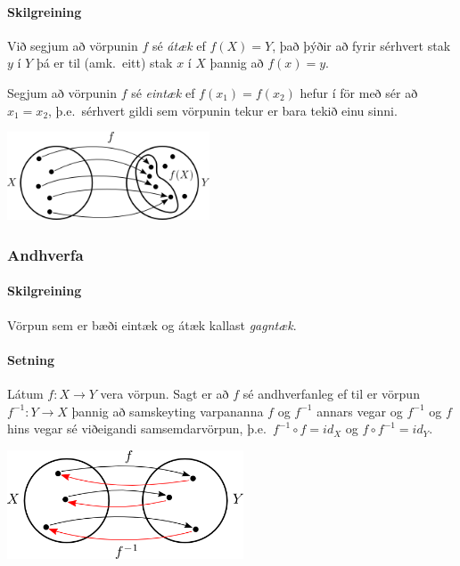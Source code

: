 \documentclass[icelandic,a4paper,12pt]{article}
\begin{document}
\pause

\paragraph{Skilgreining}
Við segjum að vörpunin $f$ sé \emph{átæk} ef $f(X)=Y$, það þýðir að 
fyrir sérhvert stak $y$ í $Y$ þá er til (amk.~eitt) stak
$x$ í $X$ þannig að $f(x)=y$.

\pause

Segjum að vörpunin $f$ sé \emph{eintæk} ef $f(x_1) = f(x_2)$ 
hefur í för með sér að $x_1=x_2$, þ.e.~sérhvert gildi sem
vörpunin tekur er bara tekið einu sinni.


\begin{center}
 \includegraphics[width=6cm,keepaspectratio=true]{./myndir/kafli01/02_Mynd_vorpunar.png}
\end{center}



\subsubsection*{Andhverfa}
 \paragraph{Skilgreining}
  Vörpun sem er bæði eintæk og átæk kallast \emph{gagntæk}.
 

 \pause
 
\paragraph{Setning}
 Látum $f:X \to Y$ vera vörpun. Sagt er að 
$f$ sé andhverfanleg ef til er vörpun 
$f^{-1}:Y \to X$
þannig að samskeyting varpananna $f$ og 
$f^{-1}$ annars vegar og 
$f^{-1}$ og 
$f$ hins vegar sé viðeigandi 
samsemdarvörpun, þ.e.~$f^{-1}\circ f=id_X$ og
$f\circ f^{-1} = id_Y$.


% 
% 
\begin{center}
 \includegraphics[width=7cm,keepaspectratio=true]{./myndir/kafli01/02_Andhverfa.png}
\end{center}
\end{document}
